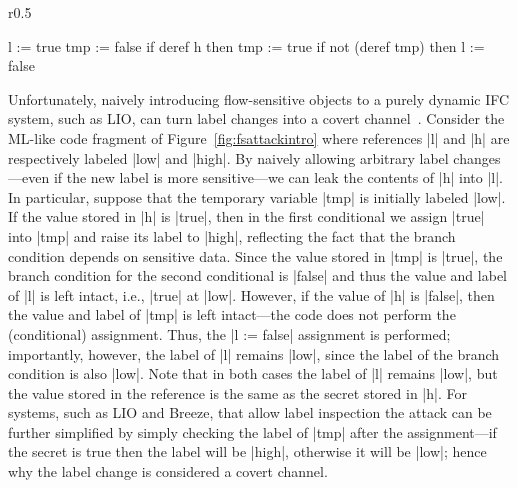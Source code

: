 \begin{wrapfigure}{r}{0.5\columnwidth}
\vspace{-15pt}
  \small
\begin{code}
l    := true
tmp  := false
if deref h then tmp := true
if not (deref tmp) then l := false
\end{code}
\vspace{-15pt}
\caption{\small\label{fig:fsattackintro} Flow-sensitive attack}
\end{wrapfigure}
%
Unfortunately, naively introducing flow-sensitive objects to a purely
dynamic IFC system, such as LIO, can turn label changes into a covert
channel~\cite{Russo:2010}. 
%
Consider the ML-like code fragment of Figure~\ref{fig:fsattackintro}
where references |l| and |h| are respectively labeled |low| and
|high|.
%
By naively allowing arbitrary label changes---even if the new label is
more sensitive---we can leak the contents of |h| into |l|.
%
In particular, suppose that the temporary variable |tmp| is initially
labeled |low|.
%
If the value stored in |h| is |true|, then in the first conditional we
assign |true| into |tmp| and raise its label to |high|, reflecting the
fact that the branch condition depends on sensitive data.
%
Since the value stored in |tmp| is |true|, the branch condition for
the second conditional is |false| and thus the value and label of |l|
is left intact, i.e., |true| at |low|.
%
However, if the value of |h| is |false|, then the value and label of
|tmp| is left intact---the code does not perform the (conditional)
assignment.
%
Thus, the |l := false| assignment is performed; importantly, however,
the label of |l| remains |low|, since the label of the branch
condition is also |low|.
%
Note that in both cases the label of |l| remains |low|, but the value
stored in the reference is the same as the secret stored in |h|.
%
For systems, such as LIO and Breeze, that allow label inspection the
attack can be further simplified by simply checking the label of |tmp|
after the assignment---if the secret is true then the label will be
|high|, otherwise it will be |low|; hence why the label change is
considered a covert channel.

